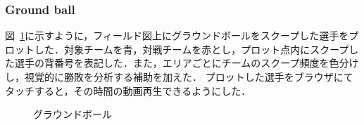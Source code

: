 \documentclass[sotsuron]{kuee}
\begin{document}
			\subsubsection{Ground ball}
				図~\ref{fig:gb}に示すように，フィールド図上にグラウンドボールをスクープした選手をプロットした．対象チームを青，対戦チームを赤とし，プロット点内にスクープした選手の背番号を表記した．また，エリアごとにチームのスクープ頻度を色分けし，視覚的に勝敗を分析する補助を加えた．
				プロットした選手をブラウザにてタッチすると，その時間の動画再生できるようにした．
					\begin{figure}
						\begin{center}
						\end{center}
						\caption{グラウンドボール}
				  		\label{fig:gb}
					\end{figure}
\end{document}
